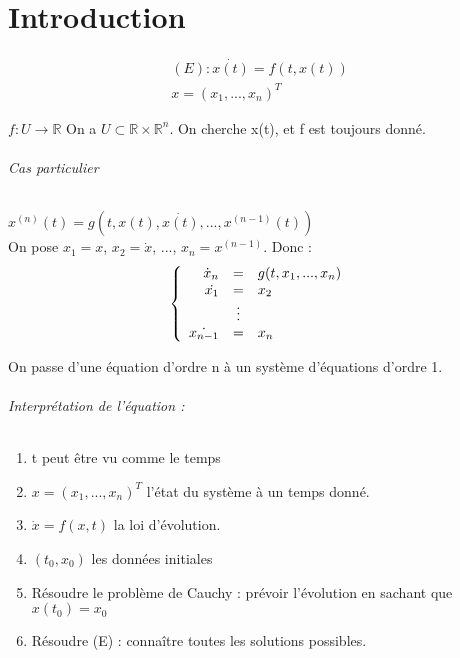 \part{Introduction}
\begin{eqnarray*}
(E):\dot{x(t)}=f(t,x(t))\\
x=(x_1,...,x_n)^T
\end{eqnarray*}

$f:U\rightarrow \mathbb{R}$
On a $U\subset \mathbb{R}\times\mathbb{R}^n$. On cherche x(t), et f est toujours donné.


\paragraph{Cas particulier}
$x^{(n)}(t)=g(t,x(t),\dot{x(t)},...,x^{(n-1)}(t))$ \\
On pose $x_1=x$, $x_2=\dot{x}$, ..., $x_n=x^{(n-1)}$. Donc :
\[
\left\{
\begin{array}{r c l}
\dot{x}_n &=& g(t,x_1,...,x_n)\\
\dot{x_1} &=& x_2\\
&\vdots&\\
\dot{x_{n-1}} &=& x_n
\end{array}
\right.
\]

On passe d'une équation d'ordre n à un système d'équations d'ordre 1.

\bigskip
{}

\paragraph{Interprétation de l'équation : \\}
\begin{enumerate}
\item t peut être vu comme le temps
\item $x=(x_1,...,x_n)^T$ l'état du système à un temps donné.
\item $\dot{x}=f(x,t)$ la loi d'évolution.
\item $(t_0,x_0)$ les données initiales
\item Résoudre le problème de Cauchy : prévoir l'évolution en sachant que $x(t_0)=x_0$
\item Résoudre (E) : connaître toutes les solutions possibles.
\end{enumerate}

